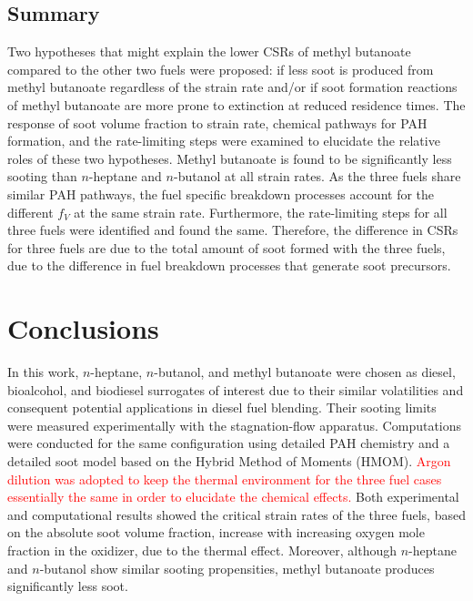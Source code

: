 \documentclass[review,3p,times]{elsarticleUS}
\begin{document}
\subsection{Summary}

Two hypotheses that might explain the lower CSRs of methyl butanoate compared to the other two fuels were proposed: if less soot is produced from methyl butanoate regardless of the strain rate and/or if soot formation reactions of methyl butanoate are more prone to extinction at reduced residence times.  The response of soot volume fraction to strain rate, chemical pathways for PAH formation, and the rate-limiting steps were examined to elucidate the relative roles of these two hypotheses.  Methyl butanoate is found to be significantly less sooting than $n$-heptane and $n$-butanol at all strain rates.  As the three fuels share similar PAH pathways, the fuel specific breakdown processes account for the different $f_V$ at the same strain rate.  Furthermore, the rate-limiting steps for all three fuels were identified and found the same.  Therefore, the difference in CSRs for three fuels are due to the total amount of soot formed with the three fuels, due to the difference in fuel breakdown processes that generate soot precursors.



\section{Conclusions}           

In this work, $n$-heptane, $n$-butanol, and methyl butanoate were chosen as diesel, bioalcohol, and biodiesel surrogates of interest due to their similar volatilities and consequent potential applications in diesel fuel blending. Their sooting limits were measured experimentally with the stagnation-flow apparatus. Computations were conducted for the same configuration using detailed PAH chemistry and a detailed soot model based on the Hybrid Method of Moments (HMOM). \textcolor{red}{Argon dilution was adopted to keep the thermal environment for the three fuel cases essentially the same in order to elucidate the chemical effects.  }Both experimental and computational results showed the critical strain rates of the three fuels, based on the absolute soot volume fraction, increase with increasing oxygen mole fraction in the oxidizer, due to the thermal effect. Moreover, although $n$-heptane and $n$-butanol show similar sooting propensities, methyl butanoate produces significantly less soot.
\end{document}
